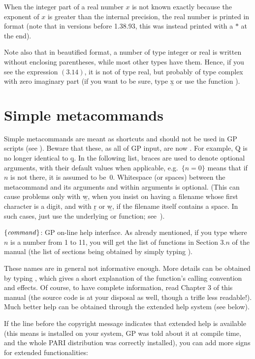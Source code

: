 When the integer part of a real number $x$ is not known exactly because the
exponent of $x$ is greater than the internal precision, the real number is
printed in  format (note that in versions before 1.38.93, this was
instead printed with a $*$ at the end).

Note also that in beautified format, a number of type integer or real is
written without enclosing parentheses, while most other types have them.
Hence, if you see the expression $( 3.14 )$, it is not of type real, but
probably of type complex with zero imaginary part (if you want to be sure, type
\b{x} or use the function ).

\section{Simple metacommands}\label{se:meta}

\noindent
Simple metacommands are meant as shortcuts and should not be used in GP
scripts (see ). Beware that these, as all of GP input,
are now . For example, \b{Q} is no longer identical to
\b{q}. In the following list, braces are used to denote optional arguments,
with their default values when applicable, e.g.~$\{n=0\}$ means that if $n$
is not there, it is assumed to be~$0$. Whitespace (or spaces) between the
metacommand and its arguments and within arguments is optional. (This can
cause problems only with \b{w}, when you insist on having a filename whose
first character is a digit, and with \b{r} or \b{w}, if the filename itself
contains a space. In such cases, just use the underlying  or
 function; see~).

 $\{\hbox{\it command\/}\}$: GP on-line help interface.
As already mentioned, if you type  where $n$ is a number from 1
to 11, you will get the list of functions in Section $3.n$ of the manual
(the list of sections being obtained by simply typing ).
\label{se:exthelp}

These names are in general not informative enough. More details can be
obtained by typing , which gives a short explanation of
the function's calling convention and effects. Of course, to have complete
information, read Chapter 3 of this manual (the source code is at your
disposal as well, though a trifle less readable!). Much better help can be
obtained through the extended help system (see below).

\unix If the line before the copyright message indicates that extended help
is available (this means  is installed on your system, GP was
told about it at compile time, and the whole PARI distribution was
correctly installed), you can add more  signs for extended
functionalities:

